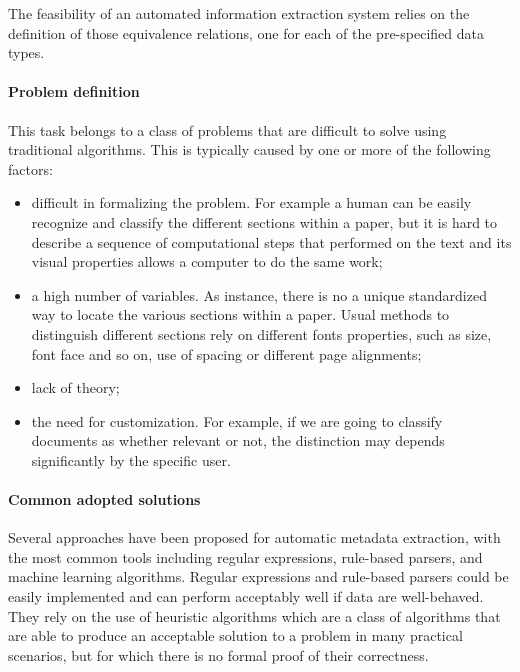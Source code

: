 The feasibility of an automated information extraction system relies on the definition of those equivalence relations, one for each of the pre-specified data types.

\paragraph{Problem definition}This task belongs to a class of problems that are difficult to solve using traditional algorithms. This is typically caused by one or more of the following factors:
\begin{itemize}
 \item difficult in formalizing the problem. For example a human can be easily recognize and classify the different sections within a paper, but it is hard to describe a sequence of computational steps that performed on the text and its visual properties allows a computer to do the same work;
 \item a high number of variables. As instance, there is no a unique standardized way to locate the various sections within a paper. Usual methods to distinguish different sections rely on different fonts properties, such as size, font face and so on, use of spacing or different page alignments;
 \item lack of theory;
 \item the need for customization. For example, if we are going to classify documents as whether relevant or not, the distinction may depends significantly by the specific user.
\end{itemize}

\paragraph{Common adopted solutions}Several approaches have been proposed for automatic metadata extraction, with the most common tools including regular expressions, rule-based parsers, and machine learning algorithms. Regular expressions and rule-based parsers could be easily implemented and can perform acceptably well if data are well-behaved. They rely on the use of heuristic algorithms which are a class of algorithms that are able to produce an acceptable solution to a problem in many practical scenarios, but for which there is no formal proof of their correctness.

